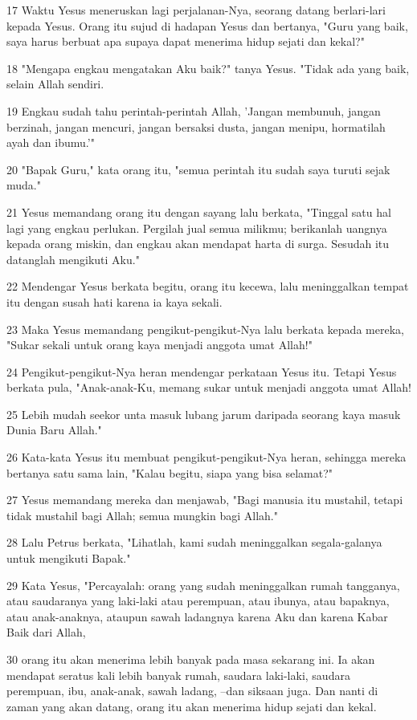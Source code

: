 \par 17 Waktu Yesus meneruskan lagi perjalanan-Nya, seorang datang berlari-lari kepada Yesus. Orang itu sujud di hadapan Yesus dan bertanya, "Guru yang baik, saya harus berbuat apa supaya dapat menerima hidup sejati dan kekal?"
\par 18 "Mengapa engkau mengatakan Aku baik?" tanya Yesus. "Tidak ada yang baik, selain Allah sendiri.
\par 19 Engkau sudah tahu perintah-perintah Allah, 'Jangan membunuh, jangan berzinah, jangan mencuri, jangan bersaksi dusta, jangan menipu, hormatilah ayah dan ibumu.'"
\par 20 "Bapak Guru," kata orang itu, "semua perintah itu sudah saya turuti sejak muda."
\par 21 Yesus memandang orang itu dengan sayang lalu berkata, "Tinggal satu hal lagi yang engkau perlukan. Pergilah jual semua milikmu; berikanlah uangnya kepada orang miskin, dan engkau akan mendapat harta di surga. Sesudah itu datanglah mengikuti Aku."
\par 22 Mendengar Yesus berkata begitu, orang itu kecewa, lalu meninggalkan tempat itu dengan susah hati karena ia kaya sekali.
\par 23 Maka Yesus memandang pengikut-pengikut-Nya lalu berkata kepada mereka, "Sukar sekali untuk orang kaya menjadi anggota umat Allah!"
\par 24 Pengikut-pengikut-Nya heran mendengar perkataan Yesus itu. Tetapi Yesus berkata pula, "Anak-anak-Ku, memang sukar untuk menjadi anggota umat Allah!
\par 25 Lebih mudah seekor unta masuk lubang jarum daripada seorang kaya masuk Dunia Baru Allah."
\par 26 Kata-kata Yesus itu membuat pengikut-pengikut-Nya heran, sehingga mereka bertanya satu sama lain, "Kalau begitu, siapa yang bisa selamat?"
\par 27 Yesus memandang mereka dan menjawab, "Bagi manusia itu mustahil, tetapi tidak mustahil bagi Allah; semua mungkin bagi Allah."
\par 28 Lalu Petrus berkata, "Lihatlah, kami sudah meninggalkan segala-galanya untuk mengikuti Bapak."
\par 29 Kata Yesus, "Percayalah: orang yang sudah meninggalkan rumah tangganya, atau saudaranya yang laki-laki atau perempuan, atau ibunya, atau bapaknya, atau anak-anaknya, ataupun sawah ladangnya karena Aku dan karena Kabar Baik dari Allah,
\par 30 orang itu akan menerima lebih banyak pada masa sekarang ini. Ia akan mendapat seratus kali lebih banyak rumah, saudara laki-laki, saudara perempuan, ibu, anak-anak, sawah ladang, --dan siksaan juga. Dan nanti di zaman yang akan datang, orang itu akan menerima hidup sejati dan kekal.

